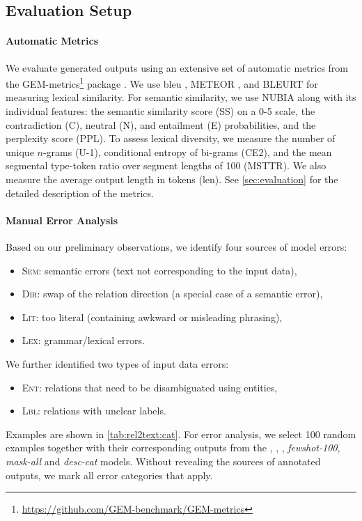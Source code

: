 \subsection{Evaluation Setup}
\label{sec:rel2text:eval}
\paragraph{Automatic Metrics}


We evaluate generated outputs using an extensive set of automatic metrics from the GEM-metrics\footnote{\url{https://github.com/GEM-benchmark/GEM-metrics}} package \cite{gehrmannGEMBenchmarkNatural2021}. We use \acs{bleu} \cite{papineni2002bleu}, \mbox{METEOR} \cite{banerjee-lavie-2005-meteor}, and BLEURT \cite{sellam2020bleurt} for measuring lexical similarity. For semantic similarity, we use NUBIA \cite{kaneNUBIANeUralBased2020} along with its individual features: the semantic similarity score (SS) on a 0-5 scale, the contradiction (C), neutral (N), and entailment (E) probabilities, and the perplexity score (PPL). To assess lexical diversity, we measure the number of unique $n$-grams (U-1), conditional entropy of bi-grams (CE2), and the mean segmental type-token ratio over segment lengths of 100 (MSTTR). We also measure the average output length in tokens (len). See \autoref{sec:evaluation} for the detailed description of the metrics.



\paragraph{Manual Error Analysis} Based on our preliminary observations, we identify four sources of model errors:
\begin{itemize}
    \item \textsc{Sem}: semantic errors (text not corresponding to the input data),
    \item \textsc{Dir}: swap of the relation direction (a special case of a semantic error),
    \item \textsc{Lit}: too literal (containing awkward or misleading phrasing),
    \item \textsc{Lex}: grammar/lexical errors.
\end{itemize}
We further identified two types of input data errors:
\begin{itemize}
    \item \textsc{Ent}: relations that need to be disambiguated using entities,
    \item \textsc{Lbl}: relations with unclear labels.
\end{itemize}
Examples are shown in \autoref{tab:rel2text:cat}.
For error analysis, we select 100 random examples together with their corresponding outputs from the \textit{\BARTr}, \textit{\BARTw}, \textit{\BARTk}, \textit{fewshot-100}, \textit{mask-all} and \textit{desc-cat} models. Without revealing the sources of annotated outputs, we mark all error categories that apply.

